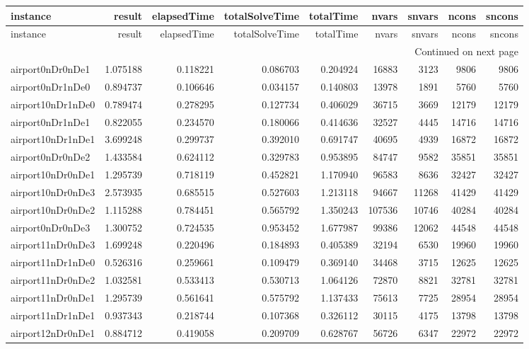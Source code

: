 
\begin{longtable}{|l|r|r|r|r|r|r|r|r|}
\toprule
instance & result & elapsedTime & totalSolveTime & totalTime & nvars & snvars & ncons & sncons \\
\midrule
\endfirsthead
\toprule
instance & result & elapsedTime & totalSolveTime & totalTime & nvars & snvars & ncons & sncons \\
\midrule
\endhead
\midrule
\multicolumn{9}{r}{Continued on next page} \\
\midrule
\endfoot
\bottomrule
\endlastfoot
airport0nDr0nDe1 & 1.075188 & 0.118221 & 0.086703 & 0.204924 & 16883 & 3123 & 9806 & 9806 \\
airport0nDr1nDe0 & 0.894737 & 0.106646 & 0.034157 & 0.140803 & 13978 & 1891 & 5760 & 5760 \\
airport10nDr1nDe0 & 0.789474 & 0.278295 & 0.127734 & 0.406029 & 36715 & 3669 & 12179 & 12179 \\
airport0nDr1nDe1 & 0.822055 & 0.234570 & 0.180066 & 0.414636 & 32527 & 4445 & 14716 & 14716 \\
airport10nDr1nDe1 & 3.699248 & 0.299737 & 0.392010 & 0.691747 & 40695 & 4939 & 16872 & 16872 \\
airport0nDr0nDe2 & 1.433584 & 0.624112 & 0.329783 & 0.953895 & 84747 & 9582 & 35851 & 35851 \\
airport10nDr0nDe1 & 1.295739 & 0.718119 & 0.452821 & 1.170940 & 96583 & 8636 & 32427 & 32427 \\
airport10nDr0nDe3 & 2.573935 & 0.685515 & 0.527603 & 1.213118 & 94667 & 11268 & 41429 & 41429 \\
airport10nDr0nDe2 & 1.115288 & 0.784451 & 0.565792 & 1.350243 & 107536 & 10746 & 40284 & 40284 \\
airport0nDr0nDe3 & 1.300752 & 0.724535 & 0.953452 & 1.677987 & 99386 & 12062 & 44548 & 44548 \\
airport11nDr0nDe3 & 1.699248 & 0.220496 & 0.184893 & 0.405389 & 32194 & 6530 & 19960 & 19960 \\
airport11nDr1nDe0 & 0.526316 & 0.259661 & 0.109479 & 0.369140 & 34468 & 3715 & 12625 & 12625 \\
airport11nDr0nDe2 & 1.032581 & 0.533413 & 0.530713 & 1.064126 & 72870 & 8821 & 32781 & 32781 \\
airport11nDr0nDe1 & 1.295739 & 0.561641 & 0.575792 & 1.137433 & 75613 & 7725 & 28954 & 28954 \\
airport11nDr1nDe1 & 0.937343 & 0.218744 & 0.107368 & 0.326112 & 30115 & 4175 & 13798 & 13798 \\
airport12nDr0nDe1 & 0.884712 & 0.419058 & 0.209709 & 0.628767 & 56726 & 6347 & 22972 & 22972 \\

\end{longtable}
